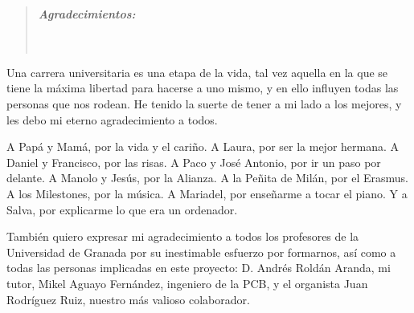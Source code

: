\cleardoublepage
{}
{}

\vspace*{2.5cm}


\begin{quotation}
\noindent \begin{center}
\textbf{\emph{\Large Agradecimientos:}}\textbf{\emph{\large }}\\
\textbf{\emph{\large }}\\
\textbf{\emph{\large }}\\
\textbf{\emph{\large }}
\par\end{center}{\large \par}
\end{quotation}

\begin{onehalfspace}

Una carrera universitaria es una etapa de la vida, tal vez aquella en la que se tiene la máxima libertad para hacerse a uno mismo, y en ello influyen todas las personas que nos rodean. He tenido la suerte de tener a mi lado a los mejores, y les debo mi eterno agradecimiento a todos.

A Papá y Mamá, por la vida y el cariño. A Laura, por ser la mejor hermana. A Daniel y Francisco, por las risas. A Paco y José Antonio, por ir un paso por delante. A Manolo y Jesús, por la Alianza. A la Peñita de Milán, por el Erasmus. A los Milestones, por la música. A Mariadel, por enseñarme a tocar el piano. Y a Salva, por explicarme lo que era un ordenador.

También quiero expresar mi agradecimiento a todos los profesores de la Universidad de Granada por su inestimable esfuerzo por formarnos, así como a todas las personas implicadas en este proyecto: D. Andrés Roldán Aranda, mi tutor, Mikel Aguayo Fernández, ingeniero de la PCB, y el organista Juan Rodríguez Ruiz, nuestro más valioso colaborador.

\end{onehalfspace}


\clearpage{\pagestyle{empty}\cleardoublepage}%
